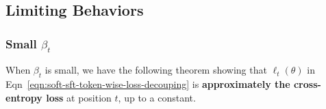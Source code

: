 \subsection{Limiting Behaviors}
\label{appendix:loss_limiting}

\subsubsection{Small $\beta_t$} 

When $\beta_t$ is small, we have the following theorem showing that $\ell_t(\theta)$ in Eqn~\ref{eqn:soft-sft-token-wise-loss-decouping} is \textbf{approximately the cross-entropy loss} at position $t$, up to a constant.

